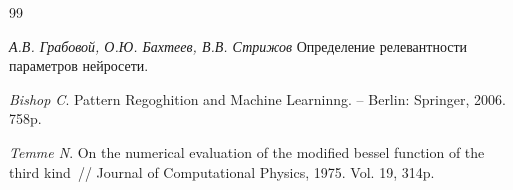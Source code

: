 \newpage


\begin{thebibliography}{99}
	
	
	
	
	
	
	
	
	
	
	
	\textit{А.В. Грабовой, О.Ю. Бахтеев, В.В. Стрижов} Определение релевантности параметров нейросети.
	
	\textit{Bishop C}. Pattern Regoghition and Machine Learninng. -- Berlin: Springer, 2006. 758p.
	
	\textit{Temme N}. On the numerical evaluation of the modified bessel function of the third kind~// Journal of Computational Physics, 1975. Vol. 19, 314p.
\end{thebibliography}